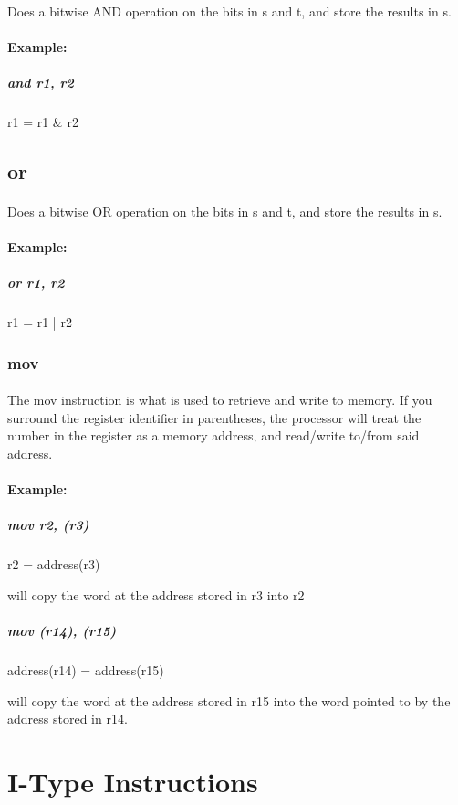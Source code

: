 \documentclass[a4paper]{article}
\begin{document}
\paragraph{} Does a bitwise AND operation on the bits in s and t, and store the results in s. 
\paragraph{Example:} 
\subparagraph{and r1, r2} r1 = r1 \& r2

\subsection{or}
\paragraph{} Does a bitwise OR operation on the bits in s and t, and store the results in s. 
\paragraph{Example:}
\subparagraph{or r1, r2} r1 = r1 | r2

\subsubsection{mov}
\paragraph{} The mov instruction is what is used to retrieve and write to memory. If you surround the register identifier in parentheses, the processor will treat the number in the register as a memory address, and read/write to/from said address.\\

\paragraph{Example:}
\subparagraph{mov r2, (r3)} r2 = address(r3)

will copy the word at the address stored in r3 into r2

\subparagraph{mov (r14), (r15)} address(r14) = address(r15)

will copy the word at the address stored in r15 into the word pointed to by the address stored in r14.


\section{I-Type Instructions}
\end{document}
